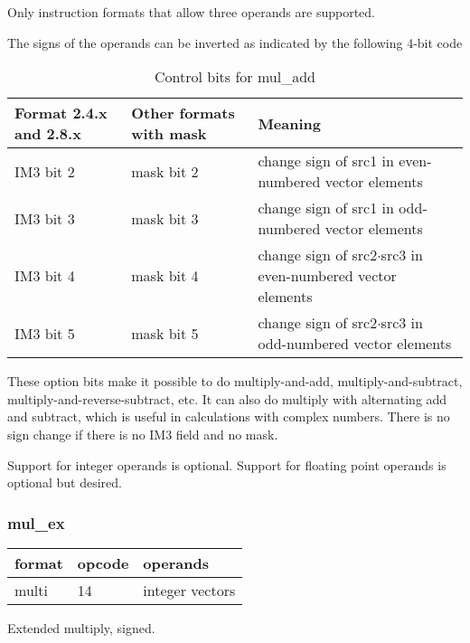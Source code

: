 \documentclass[forwardcom.tex]{subfiles}
\begin{document}
Only instruction formats that allow three operands are supported.
\vspace{2mm}

The signs of the operands can be inverted as indicated by the following 4-bit code

\begin{longtable} {|p{20mm}|p{20mm}|p{75mm}|}
\caption{Control bits for mul\_add} 
\label{table:ControlBitsForMulAdd} \\
\endfirsthead
\endhead
\hline
\bfseries Format 2.4.x and 2.8.x & \bfseries Other formats with mask & \bfseries Meaning   \\
\hline
IM3 bit 2 & mask bit 2 & change sign of src1 in even-numbered vector elements \\
IM3 bit 3 & mask bit 3 & change sign of src1 in odd-numbered vector elements \\
IM3 bit 4 & mask bit 4 & change sign of src2$\cdot$src3 in even-numbered vector elements \\
IM3 bit 5 & mask bit 5 & change sign of src2$\cdot$src3 in odd-numbered vector elements \\
\hline
\end{longtable}

\vspace{2mm}
These option bits make it possible to do multiply-and-add, multiply-and-subtract, multiply-and-reverse-subtract, etc. It can also do multiply with alternating add and subtract, which is useful in calculations with complex numbers. 
There is no sign change if there is no IM3 field and no mask. 

\vspace{2mm}
Support for integer operands is optional. Support for floating point operands is optional but desired.

\subsubsection{mul\_ex}
\label{table:mulExInstruction}
\begin{tabular}{|p{12mm}|p{12mm}|p{110mm}|}
\hline
\bfseries format & \bfseries opcode & \bfseries operands \\ \hline
multi & 14 & integer vectors \\ \hline
\end{tabular}
\vspace{2mm}

Extended multiply, signed.
\vspace{2mm}
\end{document}
